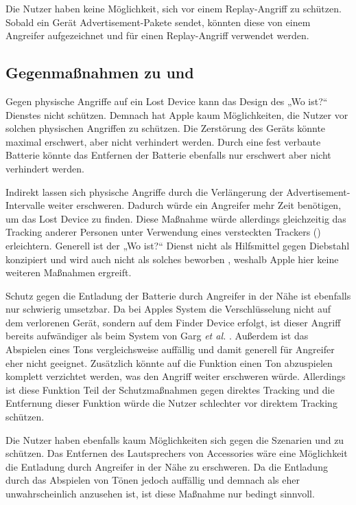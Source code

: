 Die Nutzer haben keine Möglichkeit, sich vor einem Replay-Angriff zu schützen.
Sobald ein Gerät Advertisement-Pakete sendet, könnten diese von einem Angreifer aufgezeichnet und für einen Replay-Angriff verwendet werden.


\subsection{Gegenmaßnahmen zu  und }

Gegen physische Angriffe auf ein Lost Device kann das Design des „Wo ist?“ Dienstes nicht schützen.
Demnach hat Apple kaum Möglichkeiten, die Nutzer vor solchen physischen Angriffen zu schützen.
Die Zerstörung des Geräts könnte maximal erschwert, aber nicht verhindert werden.
Durch eine fest verbaute Batterie könnte das Entfernen der Batterie ebenfalls nur erschwert aber nicht verhindert werden.

Indirekt lassen sich physische Angriffe durch die Verlängerung der Advertisement-Intervalle weiter erschweren.
Dadurch würde ein Angreifer mehr Zeit benötigen, um das Lost Device zu finden.
Diese Maßnahme würde allerdings gleichzeitig das Tracking anderer Personen unter Verwendung eines versteckten Trackers () erleichtern.
Generell ist der „Wo ist?“ Dienst nicht als Hilfsmittel gegen Diebstahl konzipiert und wird auch nicht als solches beworben \cite{Apple_WoIst}, weshalb Apple hier keine weiteren Maßnahmen ergreift.

Schutz gegen die Entladung der Batterie durch Angreifer in der Nähe ist ebenfalls nur schwierig umsetzbar.
Da bei Apples System die Verschlüsselung nicht auf dem verlorenen Gerät, sondern auf dem Finder Device erfolgt, ist dieser Angriff bereits aufwändiger als beim System von Garg \textit{et al.} \cite{Garg_Secure_Tracker}.
Außerdem ist das Abspielen eines Tons vergleichsweise auffällig und damit generell für Angreifer eher nicht geeignet.
Zusätzlich könnte auf die Funktion einen Ton abzuspielen komplett verzichtet werden, was den Angriff weiter erschweren würde.
Allerdings ist diese Funktion Teil der Schutzmaßnahmen gegen direktes Tracking und die Entfernung dieser Funktion würde die Nutzer schlechter vor direktem Tracking schützen.

Die Nutzer haben ebenfalls kaum Möglichkeiten sich gegen die Szenarien  und  zu schützen. 
Das Entfernen des Lautsprechers von Accessories wäre eine Möglichkeit die Entladung durch Angreifer in der Nähe zu erschweren.
Da die Entladung durch das Abspielen von Tönen jedoch auffällig und demnach als eher unwahrscheinlich anzusehen ist, ist diese Maßnahme nur bedingt sinnvoll.


